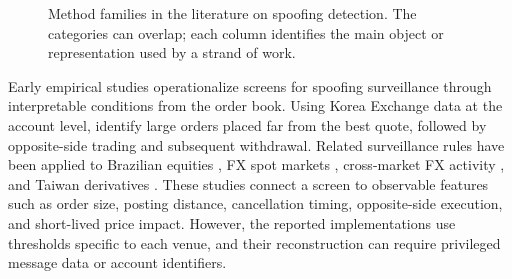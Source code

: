 \documentclass[11pt]{article}
\newenvironment{review}{\begingroup\color{blue}}{\endgroup}
\begin{document}
\begin{figure}[htbp]
    \caption{Method families in \begin{review}the literature on spoofing detection\end{review}. The categories can overlap; each column identifies
    the main object or representation used by a strand of work.}
    \label{fig:method_taxonomy}
\end{figure}

Early empirical studies operationalize \begin{review}screens for spoofing surveillance through interpretable conditions from the order book\end{review}. Using \begin{review}Korea Exchange data at the account level\end{review}, \cite{LeeEomPark2013} identify large orders placed far from the best quote, followed by opposite-side trading and
subsequent withdrawal. Related surveillance rules have been applied to Brazilian equities
\cite{MendoncaDeGenaro2020}, FX spot markets \cite{StenforsSusai2021}, cross-market FX activity
\cite{StenforsEtAl2023}, and Taiwan derivatives \cite{ChenHsiehYang2026}. These studies connect a screen to observable
features such as order size, posting distance, cancellation timing, opposite-side execution, and short-lived price
impact. However, the reported implementations use \begin{review}thresholds specific to each venue\end{review}, and their reconstruction can require
privileged message data or account identifiers.
\end{document}
